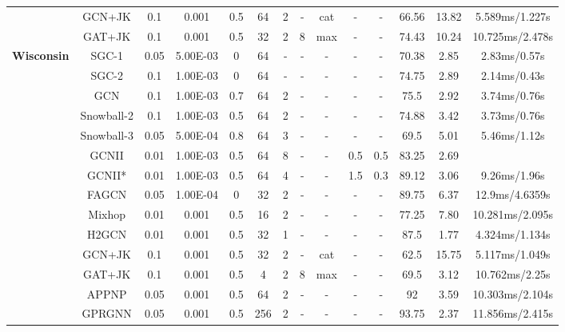 \documentclass{article}
\newcommand{\0}{{\boldsymbol{0}}}
\newcommand{\6}{{\partial}}
\newcommand{\8}{{\infty}}
\newcommand{\4}{{\nabla}}
\begin{document}
\begin{table}[htbp]
{\begin{tabular}{c|c|cccccccccccc}
          & GCN+JK & 0.1   & 0.001 & 0.5   & 64    & 2     & - & {cat} & -     & -     & 66.56 & 13.82 & {5.589ms/1.227s} \\
          &  GAT+JK & 0.1   & 0.001 & 0.5   & 32    & 2     & 8     & {max} & -     & -     & 74.43 & 10.24 & {10.725ms/2.478s} \\
    \midrule
    \multirow{14}[1]{*}{\textbf{Wisconsin}} & SGC-1 & 0.05  & 5.00E-03 & 0     & 64    & -     & -     & -     & -     & -     & 70.38 & 2.85  & 2.83ms/0.57s \\
          & SGC-2 & 0.1   & 1.00E-03 & 0     & 64    & -     & -     & -     & -     & -     & 74.75 & 2.89  & { 2.14ms/0.43s} \\
          & GCN   & 0.1   & 1.00E-03 & 0.7   & 64    & 2     & -     & -     & -     & -     & 75.5  & 2.92  & {3.74ms/0.76s} \\
          & Snowball-2 & 0.1   & 1.00E-03 & 0.5   & 64    & 2     & -     & -     & -     & -     & 74.88 & 3.42  & 3.73ms/0.76s \\
          & Snowball-3 & 0.05  & 5.00E-04 & 0.8   & 64    & 3     & -     & -     & -     & -     & 69.5  & 5.01  & {5.46ms/1.12s} \\
          & GCNII & 0.01  & 1.00E-03 & 0.5   & 64    & 8     & -     & -     & 0.5   & 0.5   & 83.25 & 2.69  &  \\
          & GCNII* & 0.01  & 1.00E-03 & 0.5   & 64    & 4     & -     & -     & 1.5   & 0.3   & 89.12 & 3.06  & 9.26ms/1.96s \\
          & FAGCN & 0.05  & 1.00E-04 & 0     & 32    & 2     & -     & -     & -     & -     & 89.75 & 6.37  & 12.9ms/4.6359s \\
          &  Mixhop & 0.01  & 0.001 & 0.5   & 16    & 2     & - & - & -     & -     & 77.25 & 7.80  & {10.281ms/2.095s} \\
          & H2GCN & 0.01  & 0.001 & 0.5   & 32    & 1     & - & - & -     & -     & 87.5  & 1.77  & {4.324ms/1.134s} \\
          & GCN+JK & 0.1   & 0.001 & 0.5   & 32    & 2     & - & {cat} & -     & -     & 62.5  & 15.75 & {5.117ms/1.049s} \\
          &  GAT+JK & 0.1   & 0.001 & 0.5   & 4     & 2     & 8     & {max} & -     & -     & 69.5  & 3.12  & {10.762ms/2.25s} \\
          & APPNP & 0.05  & 0.001 & 0.5   & 64    & 2     & - & - & -     & -     & 92    & 3.59  & {10.303ms/2.104s} \\
          & GPRGNN & 0.05  & 0.001 & 0.5   & 256   & 2     & - & - & -     & -     & 93.75 & 2.37  & {11.856ms/2.415s} \\

\end{tabular}}
\end{table}
\end{document}
